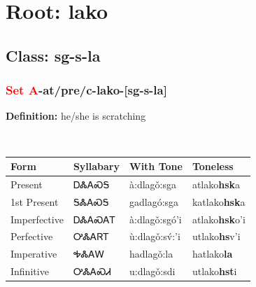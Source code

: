 \needspace{4in}
\section*{Root: lako}
\nopagebreak
{}
\needspace{3in}
\subsection*{Class: sg-s-la}
\nopagebreak
\needspace{2in}
\subsubsection*{\textcolor{Red}{Set A}{-}at/pre/c{-}\textbf{lako}{-}[sg-s-la]}
\nopagebreak
\textbf{Definition: } he/she is scratching
\\[0.5em]
\begin{tabularx}{\textwidth}{l X X X}%
\toprule%
\textbf{Form}&\textbf{Syllabary}&\textbf{With Tone}&\textbf{Toneless}\\%
\midrule%
Present&ᎠᏜᎪᏍᎦ&à:dlagǒ:sga&atlako\textbf{hsk}a\\%
1st Present&ᎦᏜᎪᏍᎦ&gadlagó:sga&katlako\textbf{hsk}a\\%
Imperfective&ᎠᏜᎪᏍᎪᎢ&à:dlagǒ:sgó’i&atlako\textbf{hsk}o'i\\%
Perfective&ᎤᏜᎪᏒᎢ&ù:dlagǒ:sv́:’i&utlako\textbf{hs}v'i\\%
Imperative&ᎭᏜᎪᎳ&hadlagǒ:la&hatlako\textbf{la}\\%
Infinitive&ᎤᏜᎪᏍᏗ&u:dlagǒ:sdi&utlako\textbf{hst}i\\%
\bottomrule%
\end{tabularx}
\\[1em]
